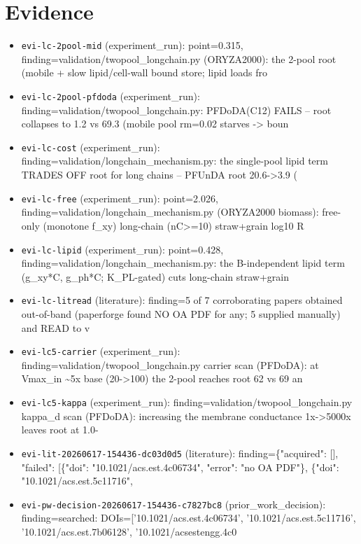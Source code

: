\documentclass{article}
\begin{document}
\section{Evidence}
\begin{itemize}
  \item \texttt{evi-lc-2pool-mid} (experiment\_run): point=0.315, finding=validation/twopool\_longchain.py (ORYZA2000): the 2-pool root (mobile + slow lipid/cell-wall bound store; lipid loads fro
  \item \texttt{evi-lc-2pool-pfdoda} (experiment\_run): finding=validation/twopool\_longchain.py: PFDoDA(C12) FAILS -- root collapses to 1.2 vs 69.3 (mobile pool rm=0.02 starves -> boun
  \item \texttt{evi-lc-cost} (experiment\_run): finding=validation/longchain\_mechanism.py: the single-pool lipid term TRADES OFF root for long chains -- PFUnDA root 20.6->3.9 (
  \item \texttt{evi-lc-free} (experiment\_run): point=2.026, finding=validation/longchain\_mechanism.py (ORYZA2000 biomass): free-only (monotone f\_xy) long-chain (nC>=10) straw+grain log10 R
  \item \texttt{evi-lc-lipid} (experiment\_run): point=0.428, finding=validation/longchain\_mechanism.py: the B-independent lipid term (g\_xy*C, g\_ph*C; K\_PL-gated) cuts long-chain straw+grain
  \item \texttt{evi-lc-litread} (literature): finding=5 of 7 corroborating papers obtained out-of-band (paperforge found NO OA PDF for any; 5 supplied manually) and READ to v
  \item \texttt{evi-lc5-carrier} (experiment\_run): finding=validation/twopool\_longchain.py carrier scan (PFDoDA): at Vmax\_in \textasciitilde{}5x base (20->100) the 2-pool reaches root 62 vs 69 an
  \item \texttt{evi-lc5-kappa} (experiment\_run): finding=validation/twopool\_longchain.py kappa\_d scan (PFDoDA): increasing the membrane conductance 1x->5000x leaves root at 1.0-
  \item \texttt{evi-lit-20260617-154436-dc03d0d5} (literature): finding=\{"acquired": [], "failed": [\{"doi": "10.1021/acs.est.4c06734", "error": "no OA PDF"\}, \{"doi": "10.1021/acs.est.5c11716",
  \item \texttt{evi-pw-decision-20260617-154436-c7827bc8} (prior\_work\_decision): finding=searched: DOIs=['10.1021/acs.est.4c06734', '10.1021/acs.est.5c11716', '10.1021/acs.est.7b06128', '10.1021/acsestengg.4c0
\end{itemize}
\end{document}
